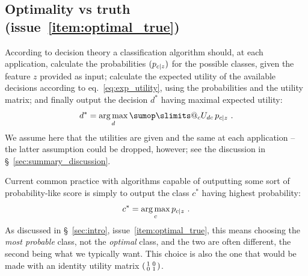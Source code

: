 \documentclass[\ifafour a4paper,12pt,\else a5paper,10pt,\fi%
onecolumn,oneside,article,%
british%
]{memoir}
\makeatletter
\theoremstyle{remark}
\theoremstyle{innote}
\def\sum{\DOTSI\sumop\slimits@}
\renewcommand*{\|}[1][]{\nonscript\:#1\vert\nonscript\:\mathopen{}}
\newcommand*{\sect}{\S}%
\newcommand*{\eqn}{eq.}%
\newcommand*{\puzzle}{{\fontencoding{U}\fontfamily{fontawesometwo}\selectfont\symbol{225}}}
\newcommand{\mynoteu}[1]{{\footnotesize\color{notecolour}\puzzle\ #1}}
\DeclareMathOperator*{\argmax}{arg\,max}
\newcommand*{\Po}{\mathord{+}}
\newcommand*{\Ne}{\mathord{-}}
\newcommand*{\tp}{\textrm{tp}}
\newcommand*{\fp}{\textrm{fp}}
\newcommand*{\itemno}{{\fontencoding{U}\fontfamily{pzd}\selectfont\symbol{55}}}
\makeatother
\begin{document}







\subsection{Optimality vs truth (issue~\ref{item:optimal_true})}
\label{sec:optimality_truth}

According to decision theory a classification algorithm should, at each application, calculate the probabilities $(p_{c\|z})$ for the possible classes, given the feature $z$ provided as input; calculate the expected utility of the available decisions according to \eqn~\eqref{eq:exp_utility}, using the probabilities and the utility matrix; and finally output the decision $d^{*}$ having maximal expected utility:
\begin{equation}
  \label{eq:argmax_decision}
  d^{*} = \argmax_{d}   \sum_{c} U_{dc}\, p_{c\|z} \ .
\end{equation}
We assume here that the utilities are given and the same at each application -- the latter assumption could be dropped, however; see the discussion in \sect~\ref{sec:summary_discussion}.

Current common practice with algorithms capable of outputting some sort of probability-like score is simply to output the class $c^{*}$ having highest probability:
\begin{equation}
  \label{eq:argmax_probable}
  c^{*} = \argmax_{c} p_{c\|z} \ .
\end{equation}
As discussed in \sect~\ref{sec:intro}, issue~\ref{item:optimal_true}, this means choosing the \emph{most probable} class, not the \emph{optimal} class, and the two are often different, the second being what we typically want. This choice is also the one that would be made with an identity utility matrix $\begin{psmallmatrix} 1&0\\0&1 \end{psmallmatrix}$.
\end{document}
